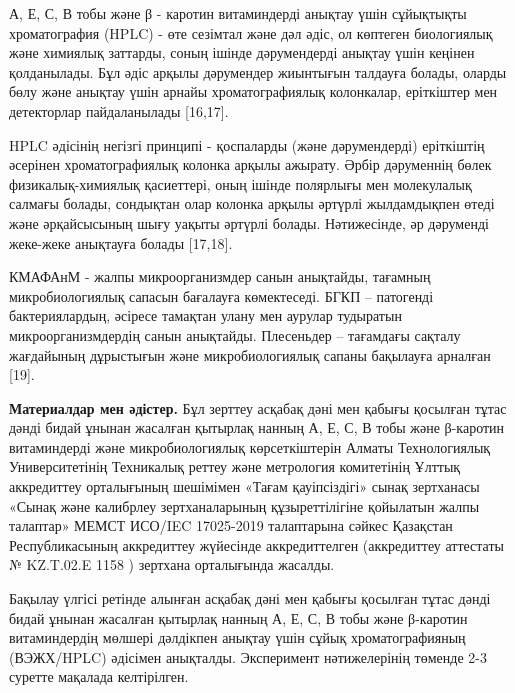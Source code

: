 \begin{multicols}{2}
А, Е, С, В тобы және β - каротин витаминдерді анықтау үшін сұйықтықты
хроматография (HPLC) - өте сезімтал және дәл әдіс, ол көптеген
биологиялық және химиялық заттарды, соның ішінде дәрумендерді анықтау
үшін кеңінен қолданылады. Бұл әдіс арқылы дәрумендер жиынтығын талдауға
болады, оларды бөлу және анықтау үшін арнайы хроматографиялық
колонкалар, еріткіштер мен детекторлар пайдаланылады {[}16,17{]}.

HPLC әдісінің негізгі принципі - қоспаларды (және дәрумендерді)
еріткіштің әсерінен хроматографиялық колонка арқылы ажырату. Әрбір
дәруменнің бөлек физикалық-химиялық қасиеттері, оның ішінде полярлығы
мен молекулалық салмағы болады, сондықтан олар колонка арқылы әртүрлі
жылдамдықпен өтеді және әрқайсысының шығу уақыты әртүрлі болады.
Нәтижесінде, әр дәруменді жеке-жеке анықтауға болады {[}17,18{]}.

КМАФАнМ - жалпы микроорганизмдер санын анықтайды, тағамның
микробиологиялық сапасын бағалауға көмектеседі. БГКП -- патогенді
бактериялардың, әсіресе тамақтан улану мен аурулар тудыратын
микроорганизмдердің санын анықтайды. Плесеньдер -- тағамдағы сақталу
жағдайының дұрыстығын және микробиологиялық сапаны бақылауға арналған
{[}19{]}.

{\bfseries Материалдар мен әдістер.} Бұл зерттеу асқабақ дәні мен қабығы
қосылған тұтас дәнді бидай ұнынан жасалған қытырлақ нанның А, Е, С, В
тобы және β-каротин витаминдерді және микробиологиялық көрсеткіштерін
Алматы Технологиялық Университетінің Техникалық реттеу және метрология
комитетінің Ұлттық аккредиттеу орталығының шешімімен «Тағам
қауіпсіздігі» сынақ зертханасы «Сынақ және калибрлеу зертханаларының
құзыреттілігіне қойылатын жалпы талаптар» МЕМСТ ИСО/IEC 17025-2019
талаптарына сәйкес Қазақстан Республикасының аккредиттеу жүйесінде
аккредиттелген (аккредиттеу аттестаты № KZ.T.02.E 1158 ) зертхана
орталығында жасалды.

Бақылау үлгісі ретінде алынған асқабақ дәні мен қабығы қосылған тұтас
дәнді бидай ұнынан жасалған қытырлақ нанның А, Е, С, В тобы және
β-каротин витаминдердің мөлшері дәлдікпен анықтау үшін сұйық
хроматографияның (ВЭЖХ/HPLC) әдісімен анықталды. Эксперимент
нәтижелерінің төменде 2-3 суретте мақалада келтірілген.


\end{multicols}
